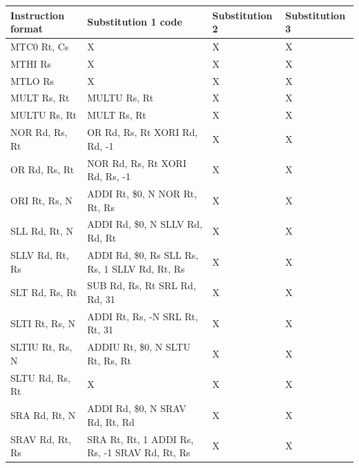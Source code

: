 \documentclass[a4paper,twoside]{article}
\theoremstyle{definition}
\theoremstyle{remark}
\begin{document}
\begin{table}[H]
\centering
\begin{tabular}{|p{}|p{}|p{}|p{}|}
\hline
\textbf{Instruction format}&\textbf{Substitution 1 code}&\textbf{Substitution 2} & \textbf{Substitution 3}\\ \hline
MTC0 Rt, Cs&X &	X & X  \\  \hline
MTHI Rs&X &	X & X  \\  \hline
MTLO Rs&X &	X & X  \\  \hline
MULT Rs, Rt&MULTU Rs, Rt &	X & X  \\  \hline
MULTU Rs, Rt&MULT Rs, Rt &	X & X  \\  \hline
NOR Rd, Rs, Rt&OR Rd, Rs, Rt \newline
               XORI Rd, Rd, -1
 &	X & X \\  \hline
OR Rd, Rs, Rt&NOR Rd, Rs, Rt \newline
              XORI Rd, Rs, -1 &		X & X  \\  \hline
ORI Rt, Rs, N&ADDI Rt, \$0, N \newline
              NOR Rt, Rt, Rs &	X & X  \\  \hline
SLL Rd, Rt, N&ADDI Rd, \$0, N \newline
              SLLV Rd, Rd, Rt &	X & X  \\  \hline
SLLV Rd, Rt, Rs&ADDI Rd, \$0, Rs \newline
                SLL Rs, Rs, 1 \newline
                SLLV Rd, Rt, Rs&	X & X  \\  \hline
SLT Rd, Rs, Rt& SUB Rd, Rs, Rt\newline
                SRL Rd, Rd, 31 &	X & X \\  \hline
SLTI Rt, Rs, N&ADDI Rt, Rs, -N\newline
               SRL Rt, Rt, 31&	X & X  \\  \hline
SLTIU Rt, Rs, N& ADDIU Rt, \$0, N\newline
                 SLTU Rt, Rs, Rt&	X & X  \\  \hline
SLTU Rd, Rs, Rt&X &	X & X  \\  \hline
SRA Rd, Rt, N&ADDI Rd, \$0, N\newline
              SRAV Rd, Rt, Rd &	X & X \\  \hline
SRAV Rd, Rt, Rs&SRA Rt, Rt, 1\newline
                ADDI Rs, Rs, -1\newline
                SRAV Rd, Rt, Rs&	X & X \\  \hline

\end{tabular}
\end{table}
\end{document}
